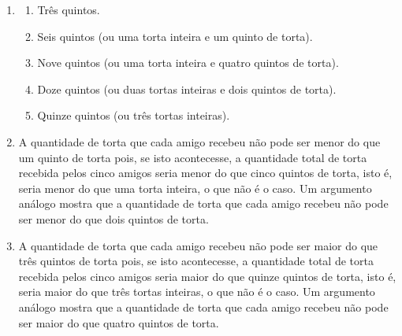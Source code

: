 \documentclass[10 pt,usenames,dvipsnames, oneside]{article}
\begin{document}
\begin{solucao}
\begin{enumerate} [label=\alph*)]
    \item
\begin{enumerate}[label=\Roman*)]
          \item Três quintos.
          \item Seis quintos (ou uma torta inteira e um quinto de torta).
          \item Nove quintos (ou uma torta inteira e quatro quintos de torta).
          \item Doze quintos (ou duas tortas inteiras e dois quintos de torta).
          \item Quinze quintos (ou três tortas inteiras).
\end{enumerate}

    \item     A quantidade de torta que cada amigo recebeu não pode ser menor do que um quinto de torta pois, se isto acontecesse, a quantidade total de torta recebida pelos cinco amigos seria menor do que cinco quintos de torta, isto é, seria menor do que uma torta inteira, o que não é o caso. Um argumento análogo mostra que a quantidade de torta que cada amigo recebeu não pode ser menor do que dois quintos de torta.
    \item      A quantidade de torta que cada amigo recebeu não pode ser maior do que três quintos de torta pois, se isto acontecesse, a quantidade total de torta recebida pelos cinco amigos seria maior do que quinze quintos de torta, isto é, seria maior do que três tortas inteiras, o que não é o caso. Um argumento análogo mostra que a quantidade de torta que cada amigo recebeu não pode ser maior do que quatro quintos de torta.
\end{enumerate} %

\end{solucao}
\fi
\end{document}
